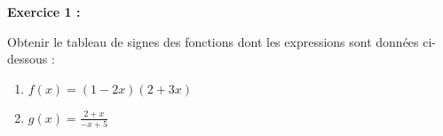 
\textbf{Exercice 1 :}

Obtenir le tableau de signes des fonctions dont les expressions sont données ci-dessous :

\begin{enumerate}
\item $f(x)=(1-2x)(2+3x)$

\item $\displaystyle g(x)=\frac{2+x}{-x+5}$

\end{enumerate}

